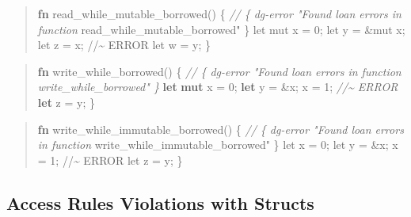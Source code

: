 \documentclass[
  11pt,
  twoside]{report}
\newenvironment{Shaded}{}{}
\newcommand{\CommentTok}[1]{\textit{#1}}
\newcommand{\DecValTok}[1]{#1}
\newcommand{\KeywordTok}[1]{\textbf{#1}}
\newcommand{\NormalTok}[1]{#1}
\newcommand{\OperatorTok}[1]{#1}
\newcommand{\StringTok}[1]{#1}
\begin{document}
\begin{quote}
\begin{Shaded}
\begin{Highlighting}[]
\KeywordTok{fn}\NormalTok{ read\_while\_mutable\_borrowed() }\OperatorTok{\{}
    \CommentTok{// \{ dg{-}error "Found loan errors in function}
\NormalTok{         read\_while\_mutable\_borrowed}\StringTok{" \}}
\StringTok{    let mut x = 0;}
\StringTok{    let y = \&mut x;}
\StringTok{    let z = x; //\textasciitilde{} ERROR}
\StringTok{    let w = y;}
\StringTok{\}}
\end{Highlighting}
\end{Shaded}
\end{quote}

\begin{quote}
\begin{Shaded}
\begin{Highlighting}[]
\KeywordTok{fn}\NormalTok{ write\_while\_borrowed() }\OperatorTok{\{}
    \CommentTok{// \{ dg{-}error "Found loan errors in function write\_while\_borrowed" \}}
    \KeywordTok{let} \KeywordTok{mut}\NormalTok{ x }\OperatorTok{=} \DecValTok{0}\OperatorTok{;}
    \KeywordTok{let}\NormalTok{ y }\OperatorTok{=} \OperatorTok{\&}\NormalTok{x}\OperatorTok{;}
\NormalTok{    x }\OperatorTok{=} \DecValTok{1}\OperatorTok{;} \CommentTok{//\textasciitilde{} ERROR}
    \KeywordTok{let}\NormalTok{ z }\OperatorTok{=}\NormalTok{ y}\OperatorTok{;}
\OperatorTok{\}}
\end{Highlighting}
\end{Shaded}
\end{quote}

\begin{quote}
\begin{Shaded}
\begin{Highlighting}[]
\KeywordTok{fn}\NormalTok{ write\_while\_immutable\_borrowed() }\OperatorTok{\{}
    \CommentTok{// \{ dg{-}error "Found loan errors in function}
\NormalTok{         write\_while\_immutable\_borrowed}\StringTok{" \}}
\StringTok{    let x = 0;}
\StringTok{    let y = \&x;}
\StringTok{    x = 1; //\textasciitilde{} ERROR}
\StringTok{    let z = y;}
\StringTok{\}}
\end{Highlighting}
\end{Shaded}
\end{quote}

\subsection{Access Rules Violations with
Structs}\label{sec:access-rules-violations-with-structs}
\end{document}
